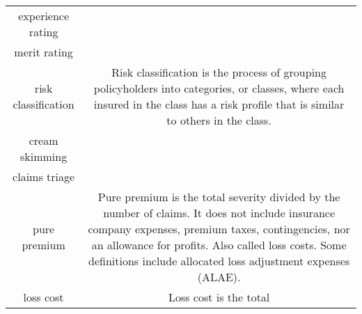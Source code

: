 \documentclass[
]{book}
\begin{document}
\begin{longtable}[]{@{}cc@{}}
\begin{minipage}[t]{0.39\columnwidth}
experience rating\strut
\end{minipage} & \begin{minipage}[t]{0.43\columnwidth}\centering
\strut
\end{minipage}\tabularnewline
\begin{minipage}[t]{0.39\columnwidth}\centering
merit rating\strut
\end{minipage} & \begin{minipage}[t]{0.43\columnwidth}\centering
\strut
\end{minipage}\tabularnewline
\begin{minipage}[t]{0.39\columnwidth}\centering
risk classification\strut
\end{minipage} & \begin{minipage}[t]{0.43\columnwidth}\centering
Risk classification is the
process of grouping
policyholders into categories,
or classes, where each insured
in the class has a risk
profile that is similar to
others in the class.\strut
\end{minipage}\tabularnewline
\begin{minipage}[t]{0.39\columnwidth}\centering
cream skimming\strut
\end{minipage} & \begin{minipage}[t]{0.43\columnwidth}\centering
\strut
\end{minipage}\tabularnewline
\begin{minipage}[t]{0.39\columnwidth}\centering
claims triage\strut
\end{minipage} & \begin{minipage}[t]{0.43\columnwidth}\centering
\strut
\end{minipage}\tabularnewline
\begin{minipage}[t]{0.39\columnwidth}\centering
pure premium\strut
\end{minipage} & \begin{minipage}[t]{0.43\columnwidth}\centering
Pure premium is the total
severity divided by the number
of claims. It does not include
insurance company expenses,
premium taxes, contingencies,
nor an allowance for profits.
Also called loss costs. Some
definitions include allocated
loss adjustment expenses
(ALAE).\strut
\end{minipage}\tabularnewline
\begin{minipage}[t]{0.39\columnwidth}\centering
loss cost\strut
\end{minipage} & \begin{minipage}[t]{0.43\columnwidth}\centering
Loss cost is the total

\end{minipage}
\end{longtable}
\end{document}
